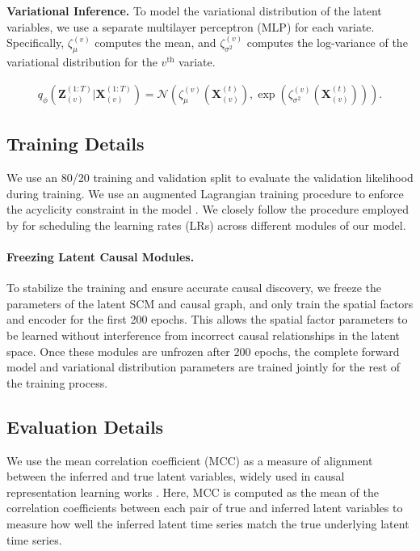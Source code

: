 \textbf{Variational Inference.} To model the variational distribution of the latent variables, we use a separate multilayer perceptron (MLP) for each variate. Specifically, $\zeta_\mu^{(v)}$ computes the mean, and $\zeta_{\sigma^2}^{(v)}$ computes the log-variance of the variational distribution for the $v^\text{th}$ variate.

\begin{align*}
    q_{\phi} \left(\mathbf{Z}^{(1:T)}_{(v)}|\mathbf{X}^{(1:T)}_{(v)}\right) = \mathcal{N} \left(\zeta_\mu^{(v)}(\mathbf{X}^{(t)}_{(v)}), \exp \left( \zeta_{\sigma^2}^{(v)}(\mathbf{X}^{(t)}_{(v)})\right) \right).
\end{align*}

\subsection{Training Details}

We use an 80/20 training and validation split to evaluate the validation likelihood during training. We use an augmented Lagrangian training procedure to enforce the acyclicity constraint in the model \citep{zheng2018dags}. We closely follow the procedure employed by \citet{geffner2022deep, gong2022rhino} for scheduling the learning rates (LRs) across different modules of our model.

\paragraph{Freezing Latent Causal Modules.} To stabilize the training and ensure accurate causal discovery, we freeze the parameters of the latent SCM and causal graph, and only train the spatial factors and encoder for the first 200 epochs. This allows the spatial factor parameters to be learned without interference from incorrect causal relationships in the latent space. Once these modules are unfrozen after 200 epochs, the complete forward model and variational distribution parameters are trained jointly for the rest of the training process. 


\subsection{Evaluation Details}
\label{subsection:eval_detail}
We use the mean correlation coefficient (MCC) as a measure of alignment between the inferred and true latent variables, widely used in causal representation learning works \citep{yao2021learning,yao2022temporally}. Here, MCC is computed as the mean of the correlation coefficients between each pair of true and inferred latent variables to measure how well the inferred latent time series match the true underlying latent time series.

